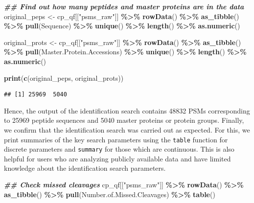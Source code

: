 \documentclass[9pt,a4paper,]{extarticle}
\newenvironment{Shaded}{\begin{snugshade}}{\end{snugshade}}
\newcommand{\DocumentationTok}[1]{\textcolor[rgb]{0.56,0.35,0.01}{\textbf{\textit{#1}}}}
\newcommand{\FunctionTok}[1]{\textcolor[rgb]{0.13,0.29,0.53}{\textbf{#1}}}
\newcommand{\NormalTok}[1]{#1}
\newcommand{\OtherTok}[1]{\textcolor[rgb]{0.56,0.35,0.01}{#1}}
\newcommand{\SpecialCharTok}[1]{\textcolor[rgb]{0.81,0.36,0.00}{\textbf{#1}}}
\newcommand{\StringTok}[1]{\textcolor[rgb]{0.31,0.60,0.02}{#1}}
\begin{document}
\begin{Shaded}
\begin{Highlighting}[]
\DocumentationTok{\#\# Find out how many peptides and master proteins are in the data}
\NormalTok{original\_peps }\OtherTok{\textless{}{-}}\NormalTok{ cp\_qf[[}\StringTok{"psms\_raw"}\NormalTok{]] }\SpecialCharTok{\%\textgreater{}\%} 
  \FunctionTok{rowData}\NormalTok{() }\SpecialCharTok{\%\textgreater{}\%} 
  \FunctionTok{as\_tibble}\NormalTok{() }\SpecialCharTok{\%\textgreater{}\%} 
  \FunctionTok{pull}\NormalTok{(Sequence) }\SpecialCharTok{\%\textgreater{}\%} 
  \FunctionTok{unique}\NormalTok{() }\SpecialCharTok{\%\textgreater{}\%}
  \FunctionTok{length}\NormalTok{() }\SpecialCharTok{\%\textgreater{}\%}
  \FunctionTok{as.numeric}\NormalTok{()}

\NormalTok{original\_prots }\OtherTok{\textless{}{-}}\NormalTok{ cp\_qf[[}\StringTok{"psms\_raw"}\NormalTok{]] }\SpecialCharTok{\%\textgreater{}\%} 
  \FunctionTok{rowData}\NormalTok{() }\SpecialCharTok{\%\textgreater{}\%} 
  \FunctionTok{as\_tibble}\NormalTok{() }\SpecialCharTok{\%\textgreater{}\%} 
  \FunctionTok{pull}\NormalTok{(Master.Protein.Accessions) }\SpecialCharTok{\%\textgreater{}\%} 
  \FunctionTok{unique}\NormalTok{() }\SpecialCharTok{\%\textgreater{}\%}
  \FunctionTok{length}\NormalTok{() }\SpecialCharTok{\%\textgreater{}\%}
  \FunctionTok{as.numeric}\NormalTok{()}

\FunctionTok{print}\NormalTok{(}\FunctionTok{c}\NormalTok{(original\_peps, original\_prots))}
\end{Highlighting}
\end{Shaded}

\begin{verbatim}
## [1] 25969  5040
\end{verbatim}

Hence, the output of the identification search contains
48832 PSMs corresponding to
25969 peptide sequences and
5040 master proteins or protein groups.
Finally, we confirm that the identification search was carried out as expected.
For this, we print summaries of the key search parameters using the \texttt{table} function
for discrete parameters and \texttt{summary} for those which are continuous. This is also
helpful for users who are analyzing publicly available data and have limited
knowledge about the identification search parameters.

\begin{Shaded}
\begin{Highlighting}[]
\DocumentationTok{\#\# Check missed cleavages}
\NormalTok{cp\_qf[[}\StringTok{"psms\_raw"}\NormalTok{]] }\SpecialCharTok{\%\textgreater{}\%}
  \FunctionTok{rowData}\NormalTok{() }\SpecialCharTok{\%\textgreater{}\%} 
  \FunctionTok{as\_tibble}\NormalTok{() }\SpecialCharTok{\%\textgreater{}\%} 
  \FunctionTok{pull}\NormalTok{(Number.of.Missed.Cleavages) }\SpecialCharTok{\%\textgreater{}\%} 
  \FunctionTok{table}\NormalTok{()}
\end{Highlighting}
\end{Shaded}
\end{document}
